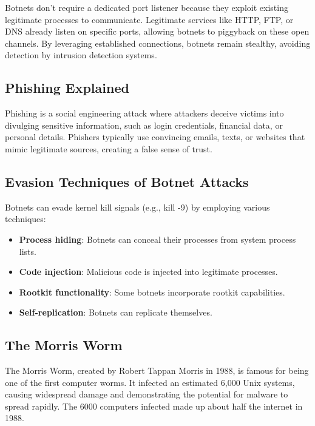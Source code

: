 \documentclass{article}
\begin{document}
Botnets don't require a dedicated port listener because they exploit existing legitimate processes to communicate. Legitimate services like HTTP, FTP, or DNS already listen on specific ports, allowing botnets to piggyback on these open channels. By leveraging established connections, botnets remain stealthy, avoiding detection by intrusion detection systems.

\subsection*{Phishing Explained}

Phishing is a social engineering attack where attackers deceive victims into divulging sensitive information, such as login credentials, financial data, or personal details. Phishers typically use convincing emails, texts, or websites that mimic legitimate sources, creating a false sense of trust.

\subsection*{Evasion Techniques of Botnet Attacks}

Botnets can evade kernel kill signals (e.g., kill -9) by employing various techniques:
\begin{itemize}
  \item \textbf{Process hiding}: Botnets can conceal their processes from system process lists.
  \item \textbf{Code injection}: Malicious code is injected into legitimate processes.
  \item \textbf{Rootkit functionality}: Some botnets incorporate rootkit capabilities.
  \item \textbf{Self-replication}: Botnets can replicate themselves.
\end{itemize}

\subsection*{The Morris Worm}

The Morris Worm, created by Robert Tappan Morris in 1988, is famous for being one of the first computer worms. It infected an estimated 6,000 Unix systems, causing widespread damage and demonstrating the potential for malware to spread rapidly. The 6000 computers infected made up about half the internet in 1988.
\clearpage
\end{document}
